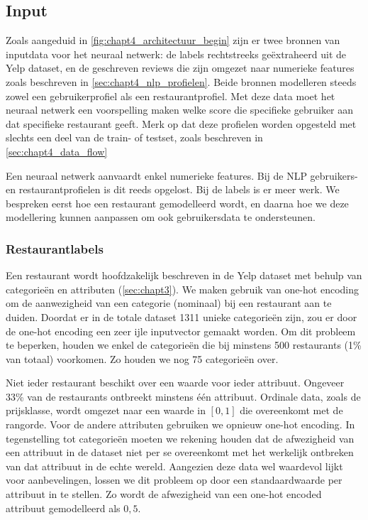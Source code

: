 \subsection{Input}
Zoals aangeduid in \autoref{fig:chapt4_architectuur_begin} zijn er twee bronnen van inputdata voor het neuraal netwerk: de labels rechtstreeks geëxtraheerd uit de Yelp dataset, en de geschreven reviews die zijn omgezet naar numerieke features zoals beschreven in \autoref{sec:chapt4_nlp_profielen}. Beide bronnen modelleren steeds zowel een gebruikerprofiel als een restaurantprofiel. Met deze data moet het neuraal netwerk een voorspelling maken welke score die specifieke gebruiker aan dat specifieke restaurant geeft. Merk op dat deze profielen worden opgesteld met slechts een deel van de train- of testset, zoals beschreven in \autoref{sec:chapt4_data_flow} %

Een neuraal netwerk aanvaardt enkel numerieke features. Bij de NLP gebruikers- en restaurantprofielen is dit reeds opgelost. Bij de labels is er meer werk. We bespreken eerst hoe een restaurant gemodelleerd wordt, en daarna hoe we deze modellering kunnen aanpassen om ook gebruikersdata te ondersteunen.
\subsubsection{Restaurantlabels}
\label{sec:chapt4_nn_restaurantlabels}
Een restaurant wordt hoofdzakelijk beschreven in de Yelp dataset met behulp van categorieën en attributen (\autoref{sec:chapt3}). We maken gebruik van one-hot encoding om de aanwezigheid van een categorie (nominaal) bij een restaurant aan te duiden. Doordat er in de totale dataset 1311 unieke categorieën zijn, zou er door de one-hot encoding een zeer ijle inputvector gemaakt worden. Om dit probleem te beperken, houden we enkel de categorieën die bij minstens 500 restaurants (1\% van totaal) voorkomen. Zo houden we nog 75 categorieën over.

Niet ieder restaurant beschikt over een waarde voor ieder attribuut. Ongeveer 33\% van de restaurants ontbreekt minstens één attribuut. Ordinale data, zoals de prijsklasse, wordt omgezet naar een waarde in $[0, 1]$ die overeenkomt met de rangorde. Voor de andere attributen gebruiken we opnieuw one-hot encoding. In tegenstelling tot categorieën moeten we rekening houden dat de afwezigheid van een attribuut in de dataset niet per se overeenkomt met het werkelijk ontbreken van dat attribuut in de echte wereld. Aangezien deze data wel waardevol lijkt voor aanbevelingen, lossen we dit probleem op door een standaardwaarde per attribuut in te stellen. Zo wordt de afwezigheid van een one-hot encoded attribuut gemodelleerd als $0,5$.

